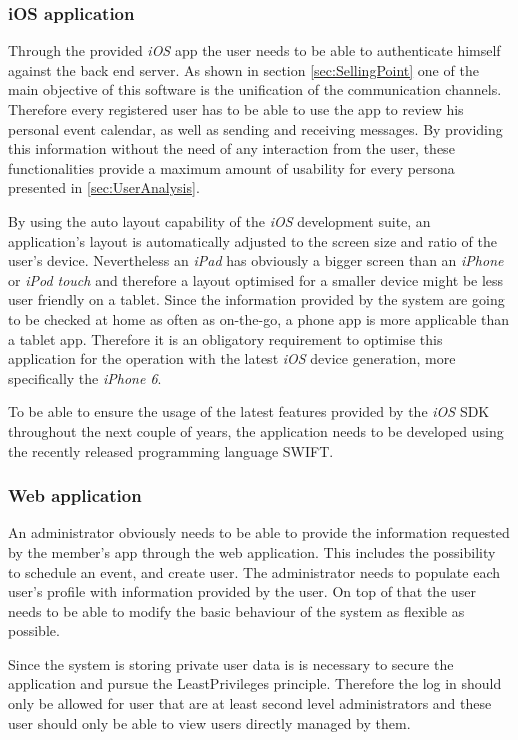 \subsubsection{iOS application}

Through the provided \emph{iOS} app the user needs to be able to authenticate himself against the back end server. As shown in section \vref{sec:SellingPoint} one of the main objective of this software is the unification of the communication channels. Therefore every registered user has to be able to use the app to review his personal event calendar, as well as sending and receiving messages. By providing this information without the need of any interaction from the user, these functionalities provide a maximum amount of usability for every persona presented in \vref{sec:UserAnalysis}. 

By using the auto layout capability of the \emph{iOS} development suite, an application's layout is automatically adjusted to the screen size and ratio of the user's device. Nevertheless an \emph{iPad} has obviously a bigger screen than an \emph{iPhone} or \emph{iPod touch} and therefore a layout optimised for a smaller device might be less user friendly on a tablet. Since the information provided by the system are going to be checked at home as often as on-the-go, a phone app is more applicable than a tablet app. Therefore it is an obligatory requirement to optimise this application for the operation with the latest \emph{iOS} device generation, more specifically the \emph{iPhone 6}.

To be able to ensure the usage of the latest features provided by the \emph{iOS} \gls{SDK} throughout the next couple of years, the application needs to be developed using the recently released programming language \gls{SWIFT}.

\subsubsection{Web application}

An administrator obviously needs to be able to provide the information requested by the member's app through the web application. This includes the possibility to schedule an event, and create user. The administrator needs to populate each user's profile with information provided by the user. On top of that the user needs to be able to modify the basic behaviour of the system as flexible as possible.

Since the system is storing private user data is is necessary to secure the application and pursue the \gls{LeastPrivileges} principle. Therefore the log in should only be allowed for user that are at least second level administrators and these user should only be able to view users directly managed by them.

